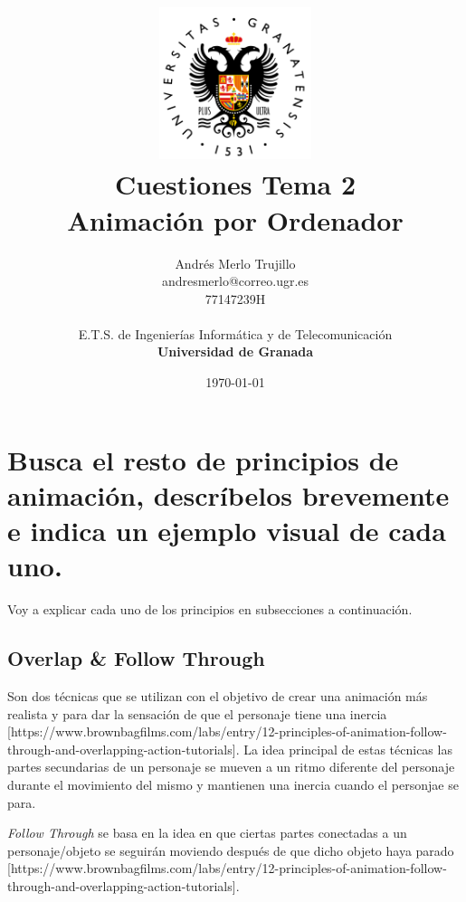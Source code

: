 \documentclass{article}
\title{
\includegraphics[width=1.75in]{imagenes/UGR-Logo.png} \\
\vspace*{1in}
\textbf{Cuestiones Tema 2} \\
Animación por Ordenador \\
\vspace*{0.5in}}
\author{Andrés Merlo Trujillo \\
andresmerlo@correo.ugr.es \\
77147239H \\ 
\vspace*{0.5in} \\
E.T.S. de Ingenierías Informática y de Telecomunicación \\
\textbf{Universidad de Granada}} \date{\today}
\begin{document}
\begin{titlingpage}
\maketitle
\end{titlingpage}

\tableofcontents

\newpage

\pagestyle{fancy}   %

\section{Busca el resto de principios de animación, descríbelos brevemente e indica un ejemplo visual de cada uno.}

Voy a explicar cada uno de los principios en subsecciones a continuación.

\subsection{Overlap \& Follow Through}

Son dos técnicas que se utilizan con el objetivo de crear una animación más realista y para dar la sensación de que el personaje tiene una inercia [https://www.brownbagfilms.com/labs/entry/12-principles-of-animation-follow-through-and-overlapping-action-tutorials]. La idea principal de estas técnicas las partes secundarias de un personaje se mueven a un ritmo diferente del personaje durante el movimiento del mismo y mantienen una inercia cuando el personjae se para.

\bigskip

\textit{Follow Through} se basa en la idea en que ciertas partes conectadas a un personaje/objeto se seguirán moviendo después de que dicho objeto haya parado [https://www.brownbagfilms.com/labs/entry/12-principles-of-animation-follow-through-and-overlapping-action-tutorials].
\end{document}
